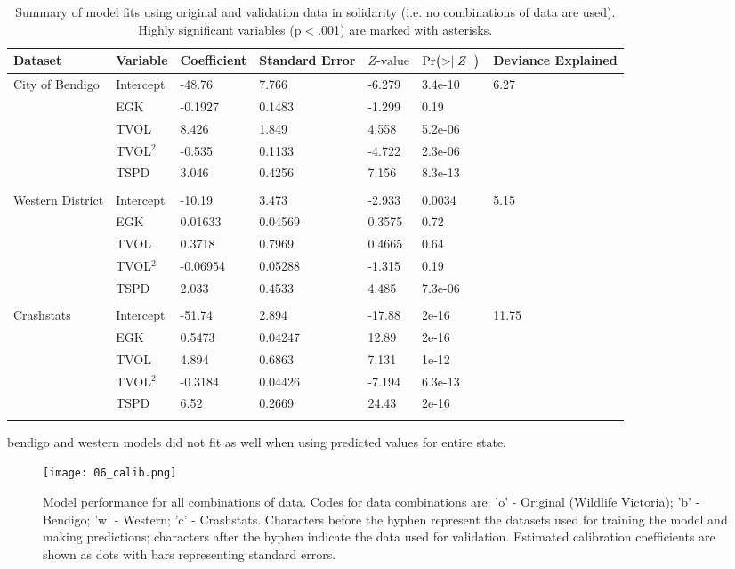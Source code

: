 \begin{table}[htp]
\caption[Summary of model fits using original and validation data]{Summary of model fits using original and validation data in solidarity (i.e. no combinations of data are used). Highly significant variables (p$<$.001) are marked with asterisks.}
\begin{tabularx}{\textwidth}{lllllll} \toprule
Dataset & Variable & Coefficient & Standard Error & $Z\text{-value}$ & $\text{Pr}\bigl( >\mid Z \mid \bigr)$ & Deviance Explained \\ 
  \midrule
City of Bendigo & Intercept & -48.76 & 7.766 & -6.279 & 3.4e-10 & 6.27 \\ 
   & EGK & -0.1927 & 0.1483 & -1.299 & 0.19 &  \\ 
   & TVOL & 8.426 & 1.849 & 4.558 & 5.2e-06 &  \\ 
   & TVOL$^2$ & -0.535 & 0.1133 & -4.722 & 2.3e-06 &  \\ 
   & TSPD & 3.046 & 0.4256 & 7.156 & 8.3e-13 &  \\ 
   &  &  &  &  &  &  \\ 
  Western District & Intercept & -10.19 & 3.473 & -2.933 & 0.0034 & 5.15 \\ 
   & EGK & 0.01633 & 0.04569 & 0.3575 & 0.72 &  \\ 
   & TVOL & 0.3718 & 0.7969 & 0.4665 & 0.64 &  \\ 
   & TVOL$^2$ & -0.06954 & 0.05288 & -1.315 & 0.19 &  \\ 
   & TSPD & 2.033 & 0.4533 & 4.485 & 7.3e-06 &  \\ 
   &  &  &  &  &  &  \\ 
  Crashstats & Intercept & -51.74 & 2.894 & -17.88 & 2e-16 & 11.75 \\ 
   & EGK & 0.5473 & 0.04247 & 12.89 & 2e-16 &  \\ 
   & TVOL & 4.894 & 0.6863 & 7.131 & 1e-12 &  \\ 
   & TVOL$^2$ & -0.3184 & 0.04426 & -7.194 & 6.3e-13 &  \\ 
   & TSPD & 6.52 & 0.2669 & 24.43 & 2e-16 &  \\ 
   &  &  &  &  &  &  \\ 
\bottomrule
\end{tabularx}
\label{val_glm_perf}
\end{table}

bendigo and western models did not fit as well when using predicted values for entire state.



\begin{figure*}[htp]
  \centering
  \texttt{[image: 06\_calib.png]}
  \caption[Collision model calibration for all combinations of original and independent data]{Model performance for all combinations of data. Codes for data combinations are: 'o' - Original (Wildlife Victoria); 'b' - Bendigo; 'w' - Western; 'c' - Crashstats. Characters before the hyphen represent the datasets used for training the model and making predictions; characters after the hyphen indicate the data used for validation. Estimated calibration coefficients are shown as dots with bars representing standard errors.}
  \label{val_calib}
\end{figure*}


